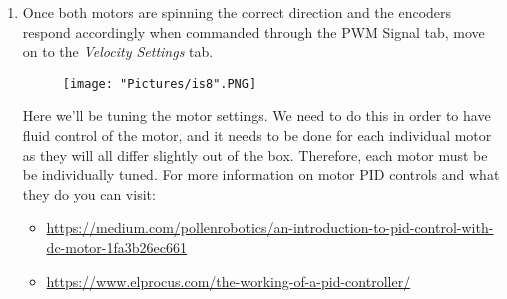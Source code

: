 \documentclass[12pt]{article}
\begin{document}
\begin{enumerate}
\begin{enumerate}
		\item Under the control pane, slowly move the slider bar up for Motor1. 		
		\begin{figure}[H]
	 		\centering
			\texttt{[image: "Pictures/is5".PNG]}
	 		\caption{}
		\end{figure}
		\noindent Verify that when the forward signal is sent to the motor (the Motor1 slider is above 0), the wheel spins in the direction that would move the rover as a whole forward (note this is different clockwise vs counterclockwise based on which wheel you are testing). \textbf{If the wheel moves backwards with respect to the rover direction, then under the General Settings tab click the checkbox labeled 'Reverse M\_ Relative Direction based on which motor is wrong.} 

		\item Now as you drive M1 motor forward (which now corresponds to the rover moving forward), verify that M1 Encoder value increases\footnote{If you get no reading values for the encoder, re-check your wiring and connections}. \textbf{If the encoder value decreases go to the General tab and under I/O click the Invert checkbox for the Encoder \_ Mode} 

		\item Repeat steps 7b and 7c for M2 motor. 
	\end{enumerate}
	\item Once both motors are spinning the correct direction and the encoders respond accordingly when commanded through the PWM Signal tab, move on to the \textit{Velocity Settings} tab.	
	
	\begin{figure}[H]
 		\centering
		\texttt{[image: "Pictures/is8".PNG]}
 		\caption{}
	\end{figure}
	\noindent Here we'll be tuning the motor settings. We need to do this in order to have fluid control of the motor, and it needs to be done for each individual motor as they will all differ slightly out of the box.  Therefore, each motor must be be individually tuned. For more information on motor PID controls and what they do you can visit:
	\begin{itemize}
		\item \href{https://medium.com/pollenrobotics/an-introduction-to-pid-control-with-dc-motor-1fa3b26ec661}{https://medium.com/pollenrobotics/an-introduction-to-pid-control-with-dc-motor-1fa3b26ec661}
		\item \href{https://www.elprocus.com/the-working-of-a-pid-controller/}{https://www.elprocus.com/the-working-of-a-pid-controller/}
	\end{itemize}


\end{enumerate}
\end{document}
